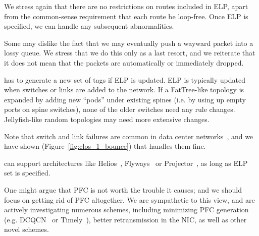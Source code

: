 We stress again that there are no restrictions on routes included in ELP, apart
from the common-sense requirement that each route be loop-free. Once ELP is
specified, we can handle any subsequent abnormalities.

 Some may dislike the fact that we may eventually push
a wayward packet into a lossy queue. We stress that we do this only as a last
resort, and we reiterate that it does not mean that the packets are
automatically or immediately dropped.

 \sysname{} has to generate a new set of tags if ELP is
updated.  ELP is typically updated when switches or links are added to the
network. If a FatTree-like topology is expanded by adding new ``pods'' under
existing spines (i.e. by using up empty ports on spine switches), none of the
older switches need any rule changes.  Jellyfish-like random topologies may need
more extensive changes.

Note that switch and link failures are common in data center
networks~\cite{netpilot}, and we have shown
(Figure~\ref{fig:clos_1_bounce}) that \sysname{} handles them fine. 

 \sysname{} can support architectures
like Helios~\cite{helios}, Flyways~\cite{flyways} or Projector~\cite{projector},
as long as ELP set is specified.

 One might argue that PFC is not worth the trouble it
causes; and we should focus on getting rid of PFC altogether.  We are
sympathetic to this view, and are actively investigating numerous schemes,
including minimizing PFC generation (e.g. DCQCN~\cite{dcqcn} or
Timely~\cite{timely}), better retransmission in the NIC, as well as other
novel schemes.  




